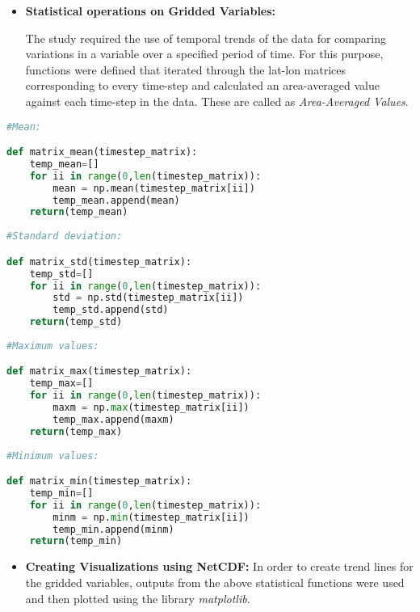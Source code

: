 \documentclass{article} %
\begin{document}
\begin{itemize}
    \item {\bf Statistical operations on Gridded Variables:}
    
The study required the use of temporal trends of the data for comparing variations in a variable over a specified period of time. For this purpose, functions were defined that iterated through the lat-lon matrices corresponding to every time-step and calculated an area-averaged value against each time-step in the data. These are called as {\it Area-Averaged Values}. 
    
    \end{itemize}

\begin{lstlisting}[language=Python, caption= Defining functions for operating on gridded variables]
#Mean:

def matrix_mean(timestep_matrix):
    temp_mean=[]
    for ii in range(0,len(timestep_matrix)):
        mean = np.mean(timestep_matrix[ii])
        temp_mean.append(mean)
    return(temp_mean)
    
#Standard deviation:

def matrix_std(timestep_matrix):
    temp_std=[]
    for ii in range(0,len(timestep_matrix)):
        std = np.std(timestep_matrix[ii])
        temp_std.append(std)
    return(temp_std)
    
#Maximum values:

def matrix_max(timestep_matrix):
    temp_max=[]
    for ii in range(0,len(timestep_matrix)):
        maxm = np.max(timestep_matrix[ii])
        temp_max.append(maxm)
    return(temp_max)
    
#Minimum values: 

def matrix_min(timestep_matrix):
    temp_min=[]
    for ii in range(0,len(timestep_matrix)):
        minm = np.min(timestep_matrix[ii])
        temp_min.append(minm)
    return(temp_min)

\end{lstlisting}

\begin{itemize}
    \item {\bf Creating Visualizations using NetCDF:}
    In order to create trend lines for the gridded variables, outputs from the above statistical functions were used and then plotted using the library {\it matplotlib}. 

    \end{itemize}
\end{document}
